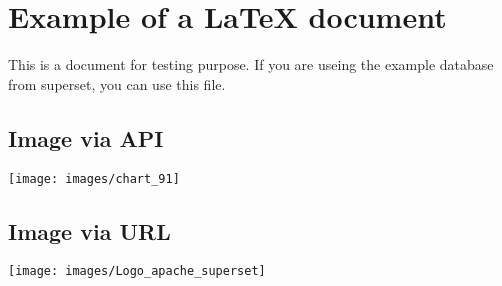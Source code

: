 \documentclass[12pt,paper=a4,ngerman]{scrartcl}
\begin{document}
\section*{Example of a LaTeX document}
This is a document for testing purpose. If you are useing the example database from superset, you can use this file.
\subsection*{Image via API}
\texttt{[image: images/chart\_91]}

\subsection*{Image via URL}
\texttt{[image: images/Logo\_apache\_superset]}
\end{document}
